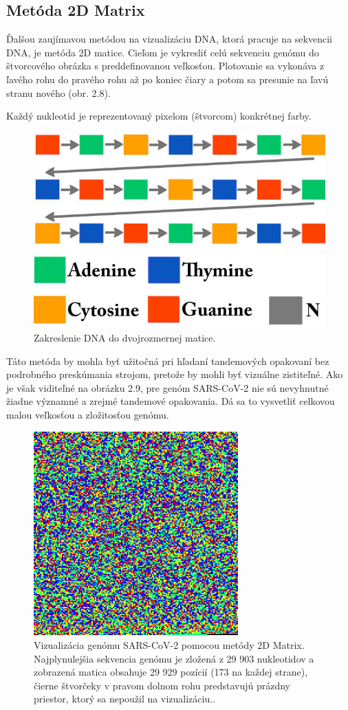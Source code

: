 \subsection{Metóda 2D Matrix}
Ďalšou zaujímavou metódou na vizualizáciu DNA, ktorá pracuje na sekvencii DNA, je metóda 2D matice.
Cieľom je vykresliť celú sekvenciu genómu do štvorcového obrázka s preddefinovanou veľkosťou.
Plotovanie sa vykonáva z ľavého rohu do pravého rohu až po koniec čiary a potom sa presunie na ľavú stranu nového (obr. 2.8).

Každý nukleotid je reprezentovaný pixelom (štvorcom) konkrétnej farby.
\begin{figure}[!ht]
	\centering
	\includegraphics[width=.4\textwidth]{figures/2d.png}
	\caption{Zakreslenie DNA do dvojrozmernej matice.\label{o:latex_friendly_zone}}
\end{figure}

Táto metóda by mohla byť užitočná pri hľadaní tandemových opakovaní \cite{fgene} bez podrobného preskúmania strojom, pretože by mohli byť vizuálne zistiteľné.
Ako je však viditeľné na obrázku 2.9, pre genóm SARS-CoV-2 nie sú nevyhnutné žiadne významné a zrejmé tandemové opakovania.
Dá sa to vysvetliť celkovou malou veľkosťou a zložitosťou genómu.

\begin{figure}[!ht]
	\centering
	\includegraphics[width=0.7\textwidth]{figures/matrix.png}
	\caption{Vizualizácia genómu SARS-CoV-2 pomocou metódy 2D Matrix. Najplynulejšia sekvencia genómu je zložená z 29 903 nukleotidov a zobrazená matica obsahuje 29 929 pozícií (173 na každej strane), čierne štvorčeky v pravom dolnom rohu predstavujú prázdny priestor, ktorý sa nepoužil na vizualizáciu..\label{o:latex_friendly_zone}}
\end{figure}

